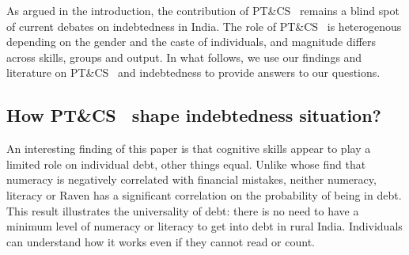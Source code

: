 \documentclass[a4paper, 11pt, onecolumn]{article}
\newcommand{\ote}{other things equal}
\newcommand{\PTCS}{PT\&CS}
\begin{document}
As argued in the introduction, the contribution of \PTCS~ remains a blind spot of current debates on indebtedness in India.
The role of \PTCS~ is heterogenous depending on the gender and the caste of individuals, and magnitude differs across skills, groups and output.
In what follows, we use our findings and literature on \PTCS~ and indebtedness to provide answers to our questions.

	\subsection{How \PTCS~ shape indebtedness situation?}

An interesting finding of this paper is that cognitive skills appear to play a limited role on individual debt, \ote.
Unlike \cite{Agarwal2013} whose find that numeracy is negatively correlated with financial mistakes, neither numeracy, literacy or Raven has a significant correlation on the probability of being in debt.
This result illustrates the universality of debt: there is no need to have a minimum level of numeracy or literacy to get into debt in rural India.
Individuals can understand how it works even if they cannot read or count.
\end{document}
